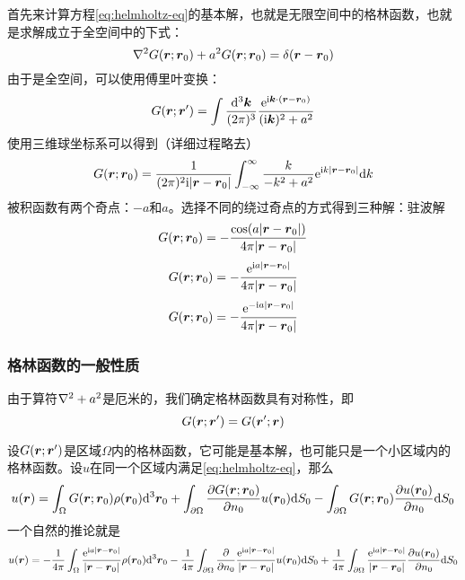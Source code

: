 \documentclass[UTF8]{ctexart}
\newcommand*{\ii}{\mathrm{i}}
\newcommand*{\ee}{\mathrm{e}}
\begin{document}
首先来计算方程\eqref{eq:helmholtz-eq}的基本解，也就是无限空间中的格林函数，也就是求解成立于全空间中的下式：
\begin{equation}
    \laplacian G(\vb*{r};\vb*{r}_0) + a^2 G(\vb*{r};\vb*{r}_0) = \delta(\vb*{r} - \vb*{r}_0)
\end{equation}
由于是全空间，可以使用傅里叶变换：
\[
    G(\vb*{r};\vb*{r}') = \int \frac{\dd[3]{\vb*{k}}}{(2\pi)^3} \frac{\ee^{\ii \vb*{k} \cdot (\vb*{r} - \vb*{r}_0)}}{(\ii \vb*{k})^2 + a^2}
\]
使用三维球坐标系可以得到（详细过程略去）
\[
    G(\vb*{r}; \vb*{r}_0) = \frac{1}{(2\pi)^2 \ii \abs{\vb*{r} - \vb*{r}_0}} \int_{-\infty}^\infty \frac{k}{-k^2 + a^2} \ee^{\ii k \abs{\vb*{r} - \vb*{r}_0}} \dd k
\]
被积函数有两个奇点：$-a$和$a$。选择不同的绕过奇点的方式得到三种解：驻波解
\begin{equation}
    G(\vb*{r};\vb*{r}_0) = - \frac{\cos (a \abs{\vb*{r} - \vb*{r}_0})}{4\pi \abs{\vb*{r} - \vb*{r}_0}}
\end{equation}
\begin{equation}
    G(\vb*{r}; \vb*{r}_0) = - \frac{\ee^{\ii a \abs{\vb*{r} - \vb*{r}_0}}}{4\pi \abs{\vb*{r} - \vb*{r}_0}}
\end{equation}
\begin{equation}
    G(\vb*{r}; \vb*{r}_0) = - \frac{\ee^{ - \ii a \abs{\vb*{r} - \vb*{r}_0}}}{4\pi \abs{\vb*{r} - \vb*{r}_0}}
\end{equation}

\subsubsection{格林函数的一般性质}

由于算符$\laplacian + a^2$是厄米的，我们确定格林函数具有对称性，即
\[
    G(\vb*{r}; \vb*{r}') = G(\vb*{r}';\vb*{r})
\]

设$G(\vb*{r};\vb*{r}')$是区域$\Omega$内的格林函数，它可能是基本解，也可能只是一个小区域内的格林函数。设$u$在同一个区域内满足\eqref{eq:helmholtz-eq}，那么
\begin{equation}
    u(\vb*{r}) = \int_\Omega G(\vb*{r};\vb*{r}_0) \rho(\vb*{r}_0) \dd[3]\vb*{r}_0 
    + \int_{\partial \Omega} \pdv{G(\vb*{r};\vb*{r}_0)}{n_0} u(\vb*{r}_0) \dd S_0 
    - \int_{\partial \Omega} G(\vb*{r}; \vb*{r}_0) \pdv{u(\vb*{r}_0)}{n_0} \dd S_0
\end{equation}
一个自然的推论就是
\begin{equation}
    u(\vb*{r}) = - \frac{1}{4\pi} \int_\Omega \frac{\ee^{\ii a \abs{\vb*{r} - \vb*{r}_0}}}{\abs{\vb*{r} - \vb*{r}_0}} \rho(\vb*{r}_0) \dd[3]\vb*{r}_0 
    - \frac{1}{4\pi} \int_{\partial \Omega} \pdv{n_0} \frac{\ee^{\ii a \abs{\vb*{r} - \vb*{r}_0}}}{\abs{\vb*{r} - \vb*{r}_0}} u(\vb*{r}_0) \dd S_0 
    + \frac{1}{4\pi} \int_{\partial \Omega} \frac{\ee^{\ii a \abs{\vb*{r} - \vb*{r}_0}}}{\abs{\vb*{r} - \vb*{r}_0}} \pdv{u(\vb*{r}_0)}{n_0} \dd S_0
    \label{eq:basic-solution-infinite-space}
\end{equation}
\end{document}
